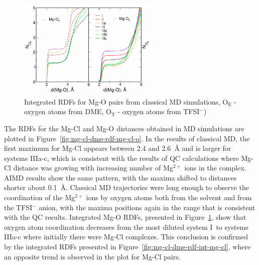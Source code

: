 \begin{figure}[ht]
    \centering
    \includegraphics[width=0.6\textwidth]{img/3-structural-data-from-md-simulations/3-mg-cl-dme/rdf-int-mg-o.png}
    \caption{Integrated RDFs for Mg-O pairs from classical MD simulations, O$_{\text{E}}$ - oxygen atoms from DME, O$_{\text{T}}$ - oxygen atoms from TFSI$^{-}$)}
    \label{fig:mg-cl-dme-rdf-int-mg-o}
\end{figure}

The RDFs for the Mg-Cl and Mg-O distances obtained in MD simulations are plotted in Figure~\ref{fig:mg-cl-dme-rdf-mg-cl-o}. In the results of classical MD, the first maximum for Mg-Cl appears between 2.4 and 2.6~{\AA} and is larger for systems IIIa-c, which is consistent with the results of QC calculations where Mg-Cl distance was growing with increasing number of Mg$^{2+}$ ions in the complex. AIMD results show the same pattern, with the maxima shifted to distances shorter about 0.1~{\AA}. Classical MD trajectories were long enough to observe the coordination of the Mg$^{2+}$ ions by oxygen atoms both from the solvent and from the TFSI$^{-}$ anion, with the maxima positions again in the range that is consistent with the QC results. Integrated Mg-O RDFs, presented in Figure~\ref{fig:mg-cl-dme-rdf-int-mg-o}, show that oxygen atom coordination decreases from the most diluted system I~to systems IIIa-c where initially there were Mg-Cl complexes. This conclusion is confirmed by the integrated RDFs presented in Figure~\ref{fig:mg-cl-dme-rdf-int-mg-cl}, where an opposite trend is observed in the plot for Mg-Cl pairs.

